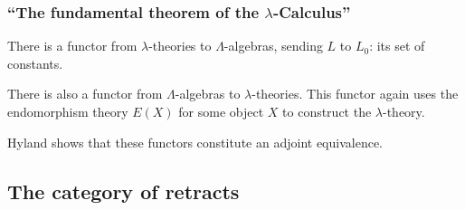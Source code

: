 \documentclass[aspectratio=169]{fancyslides} %
\begin{document}
  \begin{frame}[fragile]
    \begin{columns}
      \begin{column}{.5\textwidth}
        \tableofcontents[currentsubsection]
      \end{column}
      \begin{column}{.5\textwidth}
      \end{column}
    \end{columns}
  \end{frame}
  \begin{frame}
    \frametitle{``The fundamental theorem of the $ \lambda $-Calculus''}

    There is a functor from $ \lambda $-theories to $ \Lambda $-algebras, sending $ L $ to $ L_0 $: its set of constants.

    \pause

    There is also a functor from $ \Lambda $-algebras to $ \lambda $-theories.
    This functor again uses the endomorphism theory $ E(X) $ for some object $ X $ to construct the $ \lambda $-theory.

    \pause

    Hyland shows that these functors constitute an adjoint equivalence.
  \end{frame}

  \subsection{The category of retracts}
\end{document}
